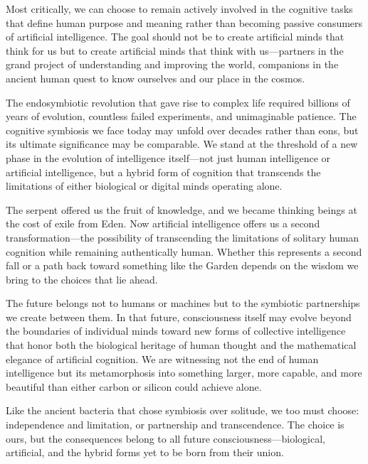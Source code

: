 Most critically, we can choose to remain actively involved in the cognitive tasks that define human purpose and meaning rather than becoming passive consumers of artificial intelligence. The goal should not be to create artificial minds that think for us but to create artificial minds that think with us—partners in the grand project of understanding and improving the world, companions in the ancient human quest to know ourselves and our place in the cosmos.

The endosymbiotic revolution that gave rise to complex life required billions of years of evolution, countless failed experiments, and unimaginable patience. The cognitive symbiosis we face today may unfold over decades rather than eons, but its ultimate significance may be comparable. We stand at the threshold of a new phase in the evolution of intelligence itself—not just human intelligence or artificial intelligence, but a hybrid form of cognition that transcends the limitations of either biological or digital minds operating alone.

The serpent offered us the fruit of knowledge, and we became thinking beings at the cost of exile from Eden. Now artificial intelligence offers us a second transformation—the possibility of transcending the limitations of solitary human cognition while remaining authentically human. Whether this represents a second fall or a path back toward something like the Garden depends on the wisdom we bring to the choices that lie ahead.

The future belongs not to humans or machines but to the symbiotic partnerships we create between them. In that future, consciousness itself may evolve beyond the boundaries of individual minds toward new forms of collective intelligence that honor both the biological heritage of human thought and the mathematical elegance of artificial cognition. We are witnessing not the end of human intelligence but its metamorphosis into something larger, more capable, and more beautiful than either carbon or silicon could achieve alone.

Like the ancient bacteria that chose symbiosis over solitude, we too must choose: independence and limitation, or partnership and transcendence. The choice is ours, but the consequences belong to all future consciousness—biological, artificial, and the hybrid forms yet to be born from their union.
